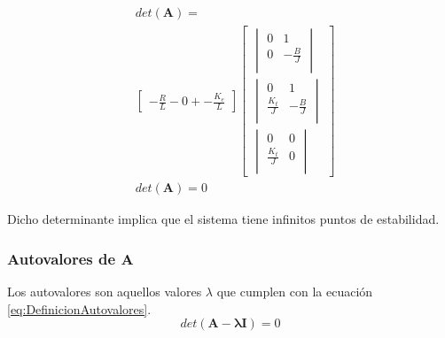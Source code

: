 \begin{align*}
  &det\left(\mathbf{A}\right) =\\
  &\begin{bmatrix}
    -\tfrac{R}{L} 
    -0
    +-\tfrac{K_e}{L}
  \end{bmatrix}
  \begin{bmatrix}
    \begin{vmatrix}
      0              &  1           \\
      0              & -\frac{B}{J} \\
    \end{vmatrix}\\
    \begin{vmatrix}
      0              &  1           \\
      \frac{K_t}{J}  & -\frac{B}{J} \\
    \end{vmatrix}\\
    \begin{vmatrix}
      0              & 0            \\
      \frac{K_t}{J}  & 0            \\
    \end{vmatrix}
  \end{bmatrix}\\
  &det\left(\mathbf{A}\right) = 0
\end{align*}

Dicho determinante implica que el sistema tiene infinitos puntos
de estabilidad.

\subsubsection{Autovalores de $\mathbf{A}$}
Los autovalores son aquellos valores $\lambda$ que cumplen con
la ecuación \eqref{eq:DefinicionAutovalores}.
\begin{equation}
  det\left(\mathbf{A-\lambda I}\right)=0
  \label{eq:DefinicionAutovalores}
\end{equation}

